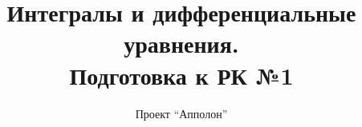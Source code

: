 \documentclass[a4paper]{article}
\title{Интегралы и дифференциальные уравнения.\\Подготовка к РК №1}
\author{Проект ``Апполон''}
\date{}
\begin{document}
  \maketitle
  \pagebreak

   
  \pagebreak
   
\end{document}
